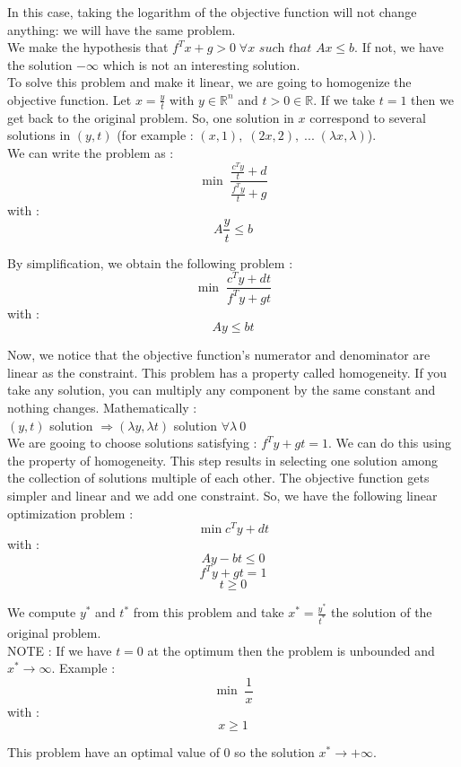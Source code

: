 In this case, taking the logarithm of the objective function will not change anything: we will have the same problem. \\

We make the hypothesis that $f^{T}x+g > 0 \; \forall x \textit{ such that } Ax \leq b$. If not, we have the solution $-\infty$ which is not an interesting solution. \\

To solve this problem and make it linear, we are going to homogenize the objective function. Let $x = \frac{y}{t}$ with $y \in \mathbb{R}^{n}$ and $t >0 \in \mathbb{R}$. If we take $t=1$ then we get back to the original problem. So, one solution in $x$ correspond to several solutions in $(y,t)$ (for example : $(x,1), \; (2x,2), \; ... \; (\lambda x,\lambda)$).\\
We can write the problem as : 
$$ \min \; \frac{\frac{c^{T}y}{t}+d}{\frac{f^{T}y}{t}+g} $$
with : 
$$ A\frac{y}{t} \leq b$$

By simplification, we obtain the following problem : 
$$ \min \; \frac{c^{T}y + dt}{f^{T}y + gt}$$
with :
$$Ay \leq bt$$

Now, we notice that the objective function's numerator and denominator are linear as the constraint. This problem has a property called homogeneity. If you take any solution, you can multiply any component by the same constant and nothing changes. Mathematically : \\
$(y,t)$ solution $\Rightarrow (\lambda y, \lambda t)$ solution $\forall \lambda \ 0$ \\

We are gooing to choose solutions satisfying : $f^{T}y+gt=1$. We can do this using the property of homogeneity. This step results in selecting one solution among the collection of solutions multiple of each other. The objective function gets simpler and linear and we add one constraint. So, we have the following linear optimization problem : 
$$ \min c^{T}y + dt$$
with : 
$$ Ay-bt \leq 0$$
$$f^{T}y+gt = 1$$
$$t \geq 0$$

We compute $y^{*}$ and $t^{*}$ from this problem and take $x^{*} = \frac{y^{*}}{t^{*}}$ the solution of the original problem.\\ NOTE : If we have $t=0$ at the optimum then the problem is unbounded and $x^{*} \rightarrow \infty$. Example : 
$$ \min \; \frac{1}{x}$$
with : 
$$x \geq 1$$ 

This problem have an optimal value of 0 so the solution $x^{*} \rightarrow + \infty$. 

